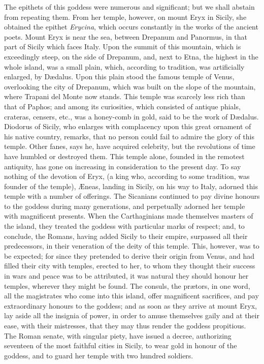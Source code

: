 \documentclass[a4paper, 11pt, oneside, polutonikogreek, english]{article}
\begin{document}
The epithets of this goddess were numerous and significant; but we shall abstain from repeating them. From her temple, however, on mount Eryx in Sicily, she obtained the epithet \emph{Erycina}, which occurs constantly in the works of the ancient poets. Mount Eryx is near the sea, between Drepanum and Panormus, in that part of Sicily which faces Italy. Upon the summit of this mountain, which is exceedingly steep, on the side of Drepanum, and, next to Etna, the highest in the whole island, was a small plain, which, according to tradition, was artificially enlarged, by Dædalus. Upon this plain stood the famous temple of Venus, overlooking the city of Drepanum, which was built on the slope of the mountain, where Trapani del Monte now stands. This temple was scarcely less rich than that of Paphos; and among its curiosities, which consisted of antique phials, crateras, censers, etc., was a honey-comb in gold, said to be the work of Dædalus. Diodorus of Sicily, who enlarges with complacency upon this great ornament of his native country, remarks, that no person could fail to admire the glory of this temple. Other fanes, says he, have acquired celebrity, but the revolutions of time have humbled or destroyed them. This temple alone, founded in the remotest antiquity, has gone on increasing in consideration to the present day. To say nothing of the devotion of Eryx, (a king who, according to some tradition, was founder of the temple), Æneas, landing in Sicily, on his way to Italy, adorned this temple with a number of offerings. The Sicanians continued to pay divine honours to the goddess during many generations, and perpetually adorned her temple with magnificent presents. When the Carthaginians made themselves masters of the island, they treated the goddess with particular marks of respect; and, to conclude, the Romans, having added Sicily to their empire, surpassed all their predecessors, in their veneration of the deity of this temple. This, however, was to be expected; for since they pretended to derive their origin from Venus, and had filled their city with temples, erected to her, to whom they thought their success in wars and peace was to be attributed, it was natural they should honour her temples, wherever they might be found. The consuls, the prætors, in one word, all the magistrates who come into this island, offer magnificent sacrifices, and pay extraordinary honours to the goddess; and as soon as they arrive at mount Eryx, lay aside all the insignia of power, in order to amuse themselves gaily and at their ease, with their mistresses, that they may thus render the goddess propitious. The Roman senate, with singular piety, have issued a decree, authorizing seventeen of the most faithful cities in Sicily, to wear gold in honour of the goddess, and to guard her temple with two hundred soldiers.
\end{document}
